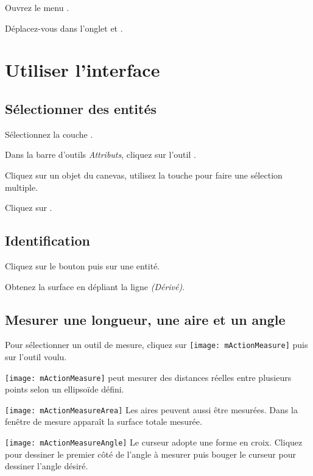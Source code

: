 Ouvrez le menu \arrow {}.

Déplacez-vous dans l'onglet  et .


\section{Utiliser l'interface}\label{sec:ui_use} 

\subsection{Sélectionner des entités}

Sélectionnez la couche .

Dans la barre d'outils \textit{Attributs}, cliquez sur l'outil .

Cliquez sur un objet du canevas, utilisez la touche  pour faire une sélection multiple.

Cliquez sur .

\subsection{Identification}

Cliquez sur le bouton  puis sur une entité.

Obtenez la surface en dépliant la ligne \textit{(Dérivé)}.

\subsection{Mesurer une longueur, une aire et un angle}

Pour sélectionner un outil de mesure, cliquez sur \texttt{[image: mActionMeasure]} puis sur l'outil voulu.

\texttt{[image: mActionMeasure]} 
\qg peut mesurer des distances réelles entre plusieurs points selon un ellipsoïde défini. \par
\texttt{[image: mActionMeasureArea]} Les aires peuvent aussi être mesurées.
Dans la fenêtre de mesure apparaît la surface totale mesurée. \par
\texttt{[image: mActionMeasureAngle]}
Le curseur adopte une forme en croix. Cliquez pour dessiner le premier côté de l'angle à mesurer puis bouger le curseur pour dessiner l'angle désiré.

